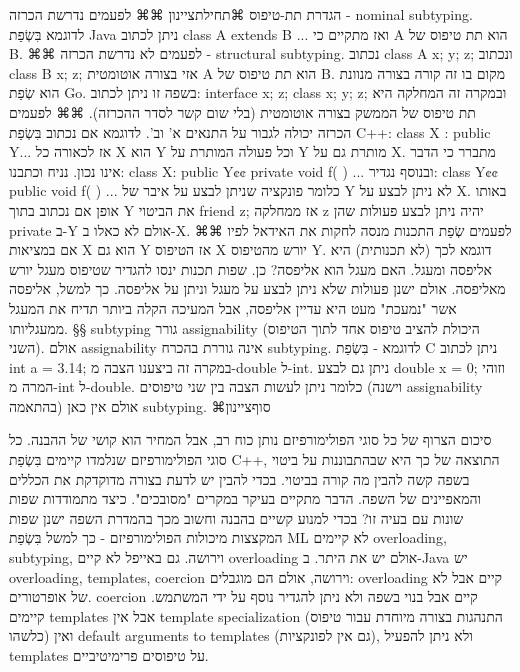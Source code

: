         הגדרת תת-טיפוס
        ⌘תחילת{ציינון}
        ⌘⌘ לפעמים נדרשת הכרזה - nominal subtyping.
        לדוגמא בִּשְׂפַת Java ניתן לכתוב class A extends B {...} ואז מתקיים כי A הוא תת טיפוס של B.
        ⌘⌘ לפעמים לא נדרשת הכרזה - structural subtyping.
        נכתוב class A { x; y; z; } ונכתוב class B {x; z;} אזי בצורה אוטומטית A הוא תת טיפוס של B.
        מקום בו זה קורה בצורה מנוונת הוא שְׂפַת Go. בשפה זו ניתן לכתוב:
        interface { x; z; }
        class {x; y; z; }
        ובמקרה זה המחלקה היא תת טיפוס של הממשק בצורה אוטומטית (בלי שום קשר לסדר ההכרזה).
        ⌘⌘ לפעמים הכרזה יכולה לגבור על התנאים א' וב'.
        לדוגמא אם נכתוב בִּשְׂפַת C++:
        class X : public Y{...} אז לכאורה כל X הוא Y וכל פעולה המותרת על Y מותרת גם על X. מתברר כי הדבר אינו נכון.
        נניח וכתבנו:
        class X: public Y{¢¢
          private void f( ) {...}
        }
        ובנוסף נגדיר:
        class Y{¢¢
          public void f( ) {...}
        }
        כלומר פונקציה שניתן לבצע על איבר של Y לא ניתן לבצע על X.
        באותו אופן אם נכתוב בתוך Y את הביטוי friend z; אז ממחלקה z יהיה ניתן לבצע פעולות שהן private ב-Y אולם לא כאלו ב-X.
        ⌘⌘ לפעמים שְׂפַת התכנות מנסה לחקות את האידאל לפיו אם במציאות X הוא גם Y אז הטיפוס X יורש מהטיפוס Y.
        דוגמא לכך (לא תכנותית) היא אליפסה ומעגל.
        האם מעגל הוא אליפסה? כן.
        שפות תכנות ינסו להגדיר שטיפוס מעגל יורש מאליפסה. אולם ישנן פעולות שלא ניתן לבצע על מעגל וניתן על אליפסה. כך למשל, אליפסה אשר "נמעכת" מעט היא עדיין אליפסה, אבל המעיכה הקלה ביותר תדיח את המעגל ממעגליותו.
        §§ subtyping גורר assignability (היכולת להציב טיפוס אחד לתוך הטיפוס השני). אולם assignability אינה גוררת בהכרח subtyping.
        לדוגמא - בִּשְׂפַת C ניתן לכתוב int a = 3.14; במקרה זה ביצענו הצבה מ-double ל-int.
        ניתן גם לבצע double x = 0; וזוהי המרה מ-int ל-double. כלומר ניתן לעשות הצבה בין שני טיפוסים (וישנה assignability בהתאמה) אולם אין כאן subtyping.
    ⌘סוף{ציינון}

        סיכום
        הצרוף של כל סוגי הפולימורפיזם נותן כוח רב, אבל המחיר הוא קושי של ההבנה. כל סוגי הפולימורפיזם שנלמדו קיימים בִּשְׂפַת C++, התוצאה של כך היא שבהתבוננות על ביטוי בשפה קשה להבין מה קורה בביטוי. בכדי להבין יש לדעת בצורה מדוקדקת את הכללים והמאפיינים של השפה. הדבר מתקיים בעיקר במקרים "מסובכים".
        כיצד מתמודדות שפות שונות עם בעיה זו? בכדי למנוע קשיים בהבנה וחשוב מכך בהמדרת השפה ישנן שפות המקצצות מיכולות הפולימורפיזם - כך למשל בִּשְׂפַת ML לא קיימים overloading, subtyping, וירושה. גם באייפל לא קיים overloading אולם יש את היתר.
        ב-Java יש overloading, templates, coercion וירושה, אולם הם מוגבלים:
        overloading קיים אבל לא של אופרטורים.
        coercion קיים אבל בנוי בשפה ולא ניתן להגדיר נוסף על ידי המשתמש.
        קיימים templates אבל אין template specialization (התנהגות בצורה מיוחדת עבור טיפוס כלשהו) ואין default arguments to templates (גם אין לפונקציות), ולא ניתן להפעיל templates על טיפוסים פרימיטיביים.

